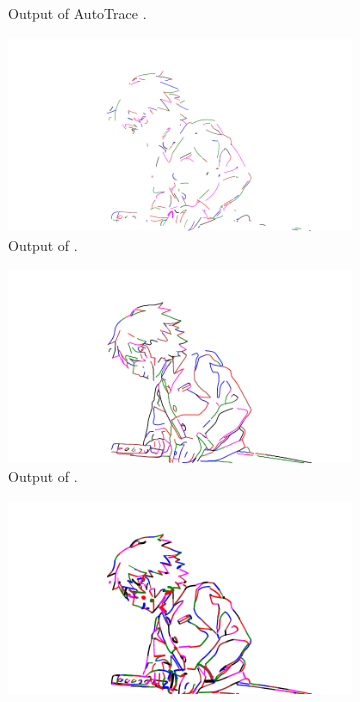 \begin{figure}[h]
\begin{subfigure}{.49\textwidth}
    \caption{Output of AutoTrace \citep{autotrace}.}
    \end{subfigure}
    \begin{subfigure}{.49\textwidth}
    \includegraphics[width=\textwidth,trim={6em 6em 12em 4em},clip]{graphics/outputs/deepvectechdraw/order/tonari-full_42.pdf}
    \caption{Output of \citet{DBLP:conf/eccv/EgiazarianVAVST20}.}
    \end{subfigure}
    \begin{subfigure}{.49\textwidth}
    \includegraphics[width=\textwidth,trim={6em 6em 12em 4em},clip]{graphics/outputs/polyvector-flow/order/tonari-full_42_nosplit.pdf}
    \caption{Output of \citet{Puhachov2021KeypointPolyvector}.}
    \label{fig:tonari-full_42_full.order.zoom.polyector}
    \end{subfigure}
    \begin{subfigure}{.49\textwidth}
    \includegraphics[width=\textwidth,trim={6em 6em 12em 4em},clip]{graphics/outputs/virtual-sketching/order/tonari-full_42.pdf}

\end{subfigure}
\end{figure}
